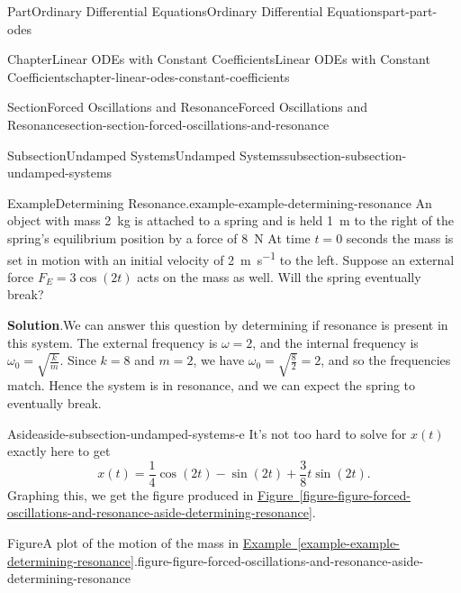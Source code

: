 \documentclass[twoside,10pt,]{book}
\newcommand{\blocktitlefont}{\relax}
\newcommand{\xreffont}{\relax}
\numberwithin{equation}{part}
\begin{document}
\begin{partptx}{Part}{Ordinary Differential Equations}{}{Ordinary Differential Equations}{}{}{part-part-odes}
\begin{chapterptx}{Chapter}{Linear ODEs with Constant Coefficients}{}{Linear ODEs with Constant Coefficients}{}{}{chapter-linear-odes-constant-coefficients}
\begin{sectionptx}{Section}{Forced Oscillations and Resonance}{}{Forced Oscillations and Resonance}{}{}{section-section-forced-oscillations-and-resonance}
\begin{subsectionptx}{Subsection}{Undamped Systems}{}{Undamped Systems}{}{}{subsection-subsection-undamped-systems}
\begin{example}{Example}{Determining Resonance.}{example-example-determining-resonance}
An object with mass \SI{2}{\kilo\gram} is attached to a spring and is held \SI{1}{\meter} to the right of the spring's equilibrium position by a force of \SI{8}{\newton} At time \(t = 0\) seconds the mass is set in motion with an initial velocity of \SI{2}{\meter\per\second} to the left. Suppose an external force \(F_{E} = 3\cos(2t)\) acts on the mass as well. Will the spring eventually break?%
\par\smallskip%
\noindent\textbf{\blocktitlefont Solution}.\hypertarget{solution-example-determining-resonance-c}{}\quad{}We can answer this question by determining if resonance is present in this system. The external frequency is \(\omega = 2\), and the internal frequency is \(\omega_{0} = \sqrt{\frac{k}{m}}\). Since \(k = 8\) and \(m = 2\), we have \(\omega_{0} = \sqrt{\frac{8}{2}} = 2\), and so the frequencies match. Hence the system is in resonance, and we can expect the spring to eventually break.%
\end{example}
\begin{aside}{Aside}{}{aside-subsection-undamped-systems-e}%
It's not too hard to solve for \(x(t)\) exactly here to get%
\begin{equation*}
x(t) = \frac{1}{4}\cos(2t) - \sin(2t) + \frac{3}{8}t\sin(2t).
\end{equation*}
Graphing this, we get the figure produced in \hyperref[figure-figure-forced-oscillations-and-resonance-aside-determining-resonance]{Figure~{\xreffont\ref{figure-figure-forced-oscillations-and-resonance-aside-determining-resonance}}}.%
\end{aside}
\begin{figureptx}{Figure}{A plot of the motion of the mass in \hyperref[example-example-determining-resonance]{Example~{\xreffont\ref{example-example-determining-resonance}}}.}{figure-figure-forced-oscillations-and-resonance-aside-determining-resonance}{}%
\begin{image}{0.25}{0.5}{0.25}{}%
%
\end{image}%
\tcblower
\end{figureptx}%
\end{subsectionptx}

\end{sectionptx}
\end{chapterptx}
\end{partptx}
\end{document}
